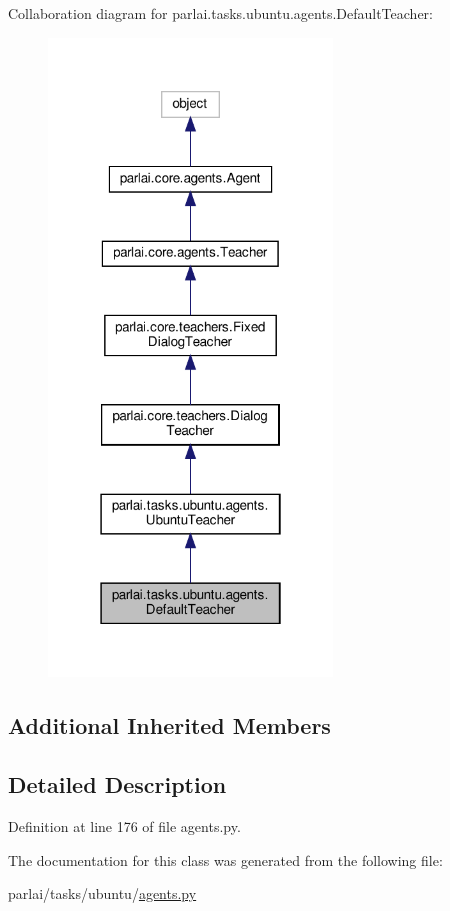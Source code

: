 Collaboration diagram for parlai.\+tasks.\+ubuntu.\+agents.\+Default\+Teacher\+:
\nopagebreak
\begin{figure}[H]
\begin{center}
\leavevmode
\includegraphics[width=214pt]{classparlai_1_1tasks_1_1ubuntu_1_1agents_1_1DefaultTeacher__coll__graph}
\end{center}
\end{figure}
\subsection*{Additional Inherited Members}


\subsection{Detailed Description}


Definition at line 176 of file agents.\+py.



The documentation for this class was generated from the following file\+:\begin{DoxyCompactItemize}
\item 
parlai/tasks/ubuntu/\hyperlink{parlai_2tasks_2ubuntu_2agents_8py}{agents.\+py}\end{DoxyCompactItemize}
